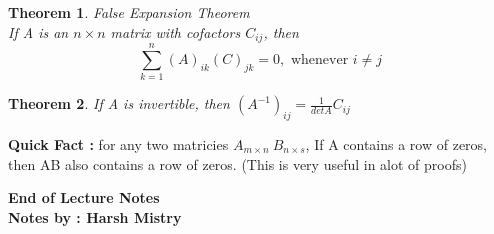\documentclass{article}
\newcounter{lecnum}
\newtheorem{theorem}{Theorem}[lecnum]
\begin{document}
\begin{theorem} False Expansion Theorem \\
If A is an \(n \times n\) matrix with cofactors \(C_{ij}\), then 
\[ \sum_{k=1}^{n} (A)_{ik}(C)_{jk} = 0, \text{ whenever } i \neq j\]
\end{theorem}

\begin{theorem}
If A is invertible, then \((A^{-1})_{ij} = \frac{1}{det A} C_{ij} \)
\end{theorem}

\textbf{Quick Fact : } for any two matricies \(A_{m\times n} \ B_{n \times s}\), If A contains a row of zeros, then AB also contains a row of zeros. (This is very useful in alot of proofs)


\begin{center}
\textbf{End of Lecture Notes}\\
\textbf{Notes by : Harsh Mistry}
\end{center}
\end{document}
